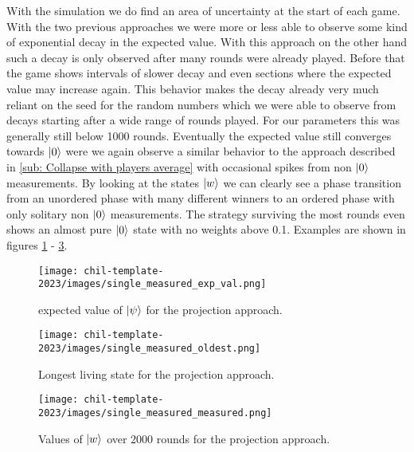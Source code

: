 With the simulation we do find an area of uncertainty at the start of each game. With the two previous approaches we were more or less able to observe some kind of exponential decay in the expected value. With this approach on the other hand such a decay is only observed after many rounds were already played. Before that the game shows intervals of slower decay and even sections where the expected value may increase again. This behavior makes the decay already very much reliant on the seed for the random numbers which we were able to observe from decays starting after a wide range of rounds played. For our parameters this was generally still below 1000 rounds. Eventually the expected value still converges towards $\ket{0}$ were we again observe a similar behavior to the approach described in \ref{sub: Collapse with players average} with occasional spikes from non $\ket{0}$ measurements. By looking at the states $\ket{w}$ we can clearly see a phase transition from an unordered phase with many different winners to an ordered phase with only solitary non $\ket{0}$ measurements. The strategy surviving the most rounds even shows an almost pure $\ket{0}$ state with no weights above 0.1. Examples are shown in figures \ref{fig:single_measured_exp_val} - \ref{fig:single_measured_measured}.

\begin{figure}[h]
    \centering
    \texttt{[image: chil-template-2023/images/single\_measured\_exp\_val.png]}
    \caption{expected value of $\ket{\psi}$ for the projection approach.}
    \label{fig:single_measured_exp_val}
\end{figure}

\begin{figure}[h]
    \centering
    \texttt{[image: chil-template-2023/images/single\_measured\_oldest.png]}
    \caption{Longest living state for the projection approach.}
    \label{fig:single_measured_oldest}
\end{figure}

\begin{figure}[h]
    \centering
    \texttt{[image: chil-template-2023/images/single\_measured\_measured.png]}
    \caption{Values of $\ket{w}$ over 2000 rounds for the projection approach.}
    \label{fig:single_measured_measured}
\end{figure}

